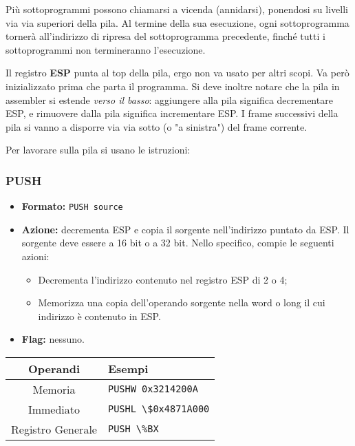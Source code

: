 \documentclass[a4paper,11pt]{article}
\begin{document}
Più sottoprogrammi possono chiamarsi a vicenda (annidarsi), ponendosi su livelli via via superiori della pila.
Al termine della sua esecuzione, ogni sottoprogramma tornerà all'indirizzo di ripresa del sottoprogramma precedente, finché tutti i sottoprogrammi non termineranno l'esecuzione.

Il registro \textbf{ESP} punta al top della pila, ergo non va usato per altri scopi.
Va però inizializzato prima che parta il programma.
Si deve inoltre notare che la pila in assembler si estende \textit{verso il basso}: aggiungere alla pila significa decrementare ESP, e rimuovere dalla pila significa incrementare ESP.
I frame successivi della pila si vanno a disporre via via sotto (o "a sinistra") del frame corrente.

Per lavorare sulla pila si usano le istruzioni:

\subsubsection{PUSH}
\begin{itemize}
	\item \textbf{Formato:} \lstinline|PUSH source|
	\item \textbf{Azione:} decrementa ESP e copia il sorgente nell'indirizzo puntato da ESP.
		Il sorgente deve essere a 16 bit o a 32 bit.
		Nello specifico, compie le seguenti azioni:
		\begin{itemize}
			\item Decrementa l'indirizzo contenuto nel registro ESP di 2 o 4;
			\item Memorizza una copia dell'operando sorgente nella word o long il cui indirizzo è contenuto in ESP.
		\end{itemize}
	\item \textbf{Flag:} nessuno.
\end{itemize}

		\begin{table}[h!]
			\center {}
			\begin{tabular} { c | p{5cm} }
				\bfseries Operandi & \bfseries Esempi \\
				\hline 
				Memoria & \lstinline|PUSHW 0x3214200A| \\ 
				Immediato & \lstinline|PUSHL \$0x4871A000| \\ 
				Registro Generale & \lstinline|PUSH \%BX|
			\end{tabular}
		\end{table}
\end{document}
